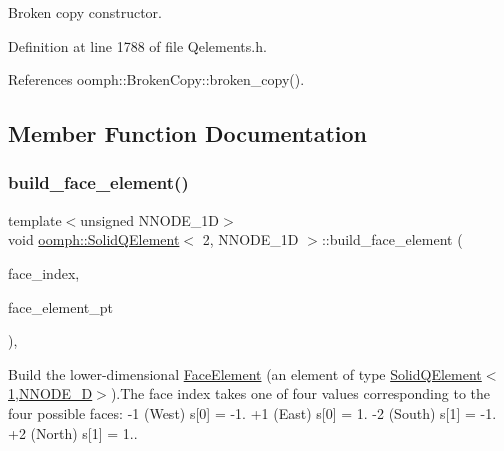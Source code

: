 Broken copy constructor. 



Definition at line 1788 of file Qelements.\+h.



References oomph\+::\+Broken\+Copy\+::broken\+\_\+copy().



\subsection{Member Function Documentation}
\mbox{\label{classoomph_1_1SolidQElement_3_012_00_01NNODE__1D_01_4_a26a18f9d58856a414152dfe588c0218d}} 
\subsubsection{\texorpdfstring{build\+\_\+face\+\_\+element()}{build\_face\_element()}}
{\footnotesize\ttfamily template$<$unsigned N\+N\+O\+D\+E\+\_\+1D$>$ \\
void \hyperlink{classoomph_1_1SolidQElement}{oomph\+::\+Solid\+Q\+Element}$<$ 2, N\+N\+O\+D\+E\+\_\+1D $>$\+::build\+\_\+face\+\_\+element (\begin{DoxyParamCaption}\item[{const int \&}]{face\+\_\+index,  }\item[{\hyperlink{classoomph_1_1FaceElement}{Face\+Element} $\ast$}]{face\+\_\+element\+\_\+pt }\end{DoxyParamCaption})\hspace{0.3cm}{\ttfamily [inline]}, {\ttfamily [virtual]}}



Build the lower-\/dimensional \hyperlink{classoomph_1_1FaceElement}{Face\+Element} (an element of type \hyperlink{classoomph_1_1SolidQElement_3_011_00_01NNODE__1D_01_4}{Solid\+Q\+Element$<$1,\+N\+N\+O\+D\+E\+\_\+D$>$}).The face index takes one of four values corresponding to the four possible faces\+: -\/1 (West) s\mbox{[}0\mbox{]} = -\/1. +1 (East) s\mbox{[}0\mbox{]} = 1. -\/2 (South) s\mbox{[}1\mbox{]} = -\/1. +2 (North) s\mbox{[}1\mbox{]} = 1.. 

